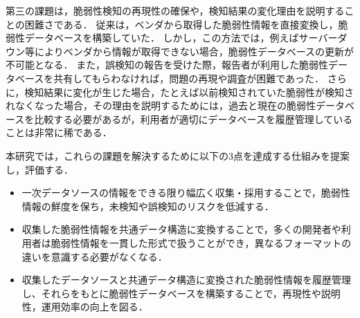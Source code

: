 第三の課題は，脆弱性検知の再現性の確保や，検知結果の変化理由を説明することの困難さである．
従来は，ベンダから取得した脆弱性情報を直接変換し，脆弱性データベースを構築していた．
しかし，この方法では，例えばサーバーダウン等によりベンダから情報が取得できない場合，脆弱性データベースの更新が不可能となる．
また，誤検知の報告を受けた際，報告者が利用した脆弱性データベースを共有してもらわなければ，問題の再現や調査が困難であった．
さらに，検知結果に変化が生じた場合，たとえば以前検知されていた脆弱性が検知されなくなった場合，その理由を説明するためには，過去と現在の脆弱性データベースを比較する必要があるが，利用者が適切にデータベースを履歴管理していることは非常に稀である．

本研究では，これらの課題を解決するために以下の3点を達成する仕組みを提案し，評価する．
\begin{itemize}
    \item 一次データソースの情報をできる限り幅広く収集・採用することで，脆弱性情報の鮮度を保ち，未検知や誤検知のリスクを低減する．
    \item 収集した脆弱性情報を共通データ構造に変換することで，多くの開発者や利用者は脆弱性情報を一貫した形式で扱うことができ，異なるフォーマットの違いを意識する必要がなくなる．
    \item 収集したデータソースと共通データ構造に変換された脆弱性情報を履歴管理し、それらをもとに脆弱性データベースを構築することで，再現性や説明性，運用効率の向上を図る．
\end{itemize}